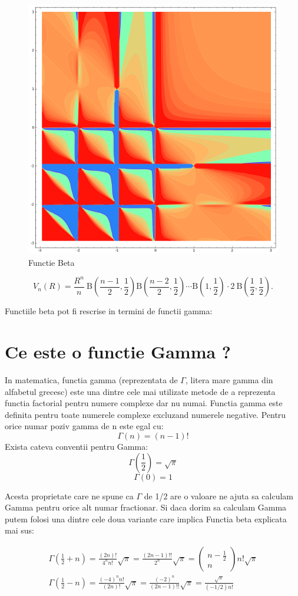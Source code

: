 \documentclass[12pt]{caltech_thesis}
\begin{document}
\begin{figure}[hbt!]
\centering
\includegraphics[width=.5\textwidth]{beta.png}
\caption{Functie Beta}\label{fig:logo}
\end{figure}

$$
V_{n}(R)=\frac{R^{n}}{n} \mathrm{~B}\left(\frac{n-1}{2}, \frac{1}{2}\right) \mathrm{B}\left(\frac{n-2}{2}, \frac{1}{2}\right) \cdots \mathrm{B}\left(1, \frac{1}{2}\right) \cdot 2 \mathrm{~B}\left(\frac{1}{2}, \frac{1}{2}\right) .
$$

Functiile beta pot fi rescrise in termini de functii gamma:

\section{Ce este o functie Gamma ?}
In matematica, functia gamma (reprezentata de  \(\Gamma\), litera mare gamma din alfabetul grecesc) este una dintre cele mai utilizate metode de a reprezenta functia factorial pentru numere complexe dar nu numai. Functia gamma este definita pentru toate numerele complexe excluzand numerele negative. Pentru orice numar poziv gamma de n este egal cu:
\[\Gamma(n) = (n-1)!\]
Exista cateva conventii pentru Gamma:
$$
\Gamma\left(\frac{1}{2}\right)=\sqrt{\pi} 
$$
$$
\Gamma(0)=1
$$

Acesta proprietate care ne spune ca \(\Gamma\) de 1/2 are o valoare ne ajuta sa calculam Gamma pentru orice alt numar fractionar.
Si daca dorim sa calculam Gamma putem folosi una dintre cele doua variante care implica Functia beta explicata mai sus:


$$
\begin{array}{l}
\Gamma\left(\frac{1}{2}+n\right)=\frac{(2 n) !}{4^{n} n !} \sqrt{\pi}=\frac{(2 n-1) ! !}{2^{n}} \sqrt{\pi}=\left(\begin{array}{c}
n-\frac{1}{2} \\
n
\end{array}\right) n ! \sqrt{\pi} \\
\Gamma\left(\frac{1}{2}-n\right)=\frac{(-4)^{n} n !}{(2 n) !} \sqrt{\pi}=\frac{(-2)^{n}}{(2 n-1) ! !} \sqrt{\pi}=\frac{\sqrt{\pi}}{(-1 / 2) n !}
\end{array}
$$
\end{document}
